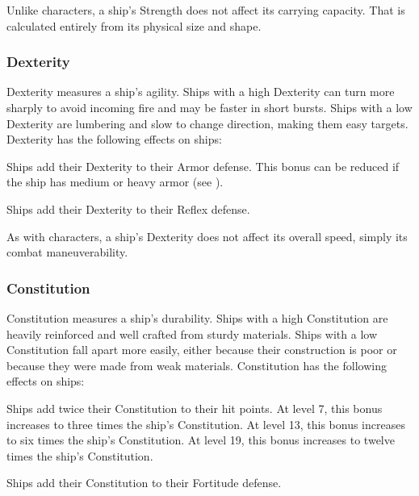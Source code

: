             Unlike characters, a ship's Strength does not affect its carrying capacity.
            That is calculated entirely from its physical size and shape.

        \subsubsection{Dexterity}
            Dexterity measures a ship's agility.
            Ships with a high Dexterity can turn more sharply to avoid incoming fire and may be faster in short bursts.
            Ships with a low Dexterity are lumbering and slow to change direction, making them easy targets.
            Dexterity has the following effects on ships:
            \begin{raggeditemize}
                \item Ships add their Dexterity to their Armor defense.
                    This bonus can be reduced if the ship has medium or heavy armor (see ).
                \item Ships add their Dexterity to their Reflex defense.
            \end{raggeditemize}

            As with characters, a ship's Dexterity does not affect its overall speed, simply its combat maneuverability.

        \subsubsection{Constitution}
            Constitution measures a ship's durability.
            Ships with a high Constitution are heavily reinforced and well crafted from sturdy materials.
            Ships with a low Constitution fall apart more easily, either because their construction is poor or because they were made from weak materials.
            Constitution has the following effects on ships:
            \begin{raggeditemize}
                \item Ships add twice their Constitution to their hit points.
                    At level 7, this bonus increases to three times the ship's Constitution.
                    At level 13, this bonus increases to six times the ship's Constitution.
                    At level 19, this bonus increases to twelve times the ship's Constitution.
                \item Ships add their Constitution to their Fortitude defense.
            \end{raggeditemize}

